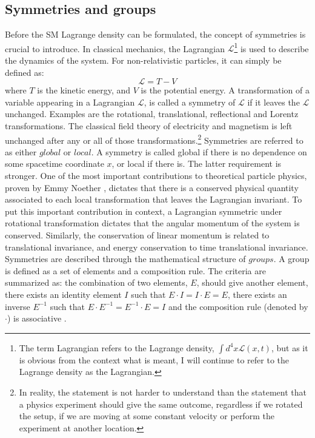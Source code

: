 \subsection*{Symmetries and groups}\label{sec:symmetries}
\noindent\justify
Before the SM Lagrange density can be formulated, the concept of symmetries is crucial to introduce. 
In classical mechanics, the Lagrangian $\mathcal{L}$\footnote{The term Lagrangian refers to the Lagrange density, $\int d^{4}x\mathcal{L}(x,t)$, but as it is obvious from the context what is meant, I will continue to refer to the Lagrange density as the Lagrangian. } is used to describe the dynamics of the system. 
For non-relativistic particles, it can simply be defined as:
\begin{equation}
\mathcal{L}=T-V
\end{equation}
where $T$ is the kinetic energy, and $V$ is the potential energy. 
A transformation of a variable appearing in a Lagrangian $\mathcal{L}$, is called a symmetry of $\mathcal{L}$ if it leaves the $\mathcal{L}$ unchanged. 
Examples are the rotational, translational, reflectional and Lorentz transformations. 
The classical field theory of electricity and magnetism is left unchanged after any or all of those transformations.\footnote{In reality, the statement is not harder to understand than the statement that a physics experiment should give the same outcome, regardless if we rotated the setup, if we are moving at some constant velocity or perform the experiment at another location.} 
Symmetries are referred to as either $global$ or $local$.
A symmetry is called global if there is no dependence on some spacetime coordinate $x$, or local if there is. The latter requirement is stronger.  
\newpara
\noindent\justify
One of the most important contributions to theoretical particle physics, proven by Emmy Noether \cite{Noether1918}, dictates that there is a conserved physical quantity associated to each local transformation that leaves the Lagrangian invariant.   
To put this important contribution in context, a Lagrangian symmetric under rotational transformation dictates that the angular momentum of the system is conserved.
Similarly, the conservation of linear momentum is related to translational invariance, and energy conservation to time translational invariance.  
Symmetries are described through the mathematical structure of $groups$. 
A group is defined as a set of elements and a composition rule. 
The criteria are summarized as: the combination of two elements, $E$, should give another element, there exists an identity element $I$ such that $E\cdot I=I\cdot E=E$, there exists an inverse $E^{-1}$ such that $E\cdot E^{-1}=E^{-1}\cdot E=I$ and the composition rule (denoted by $\cdot$) is associative \cite{Kane:2244793}.   
